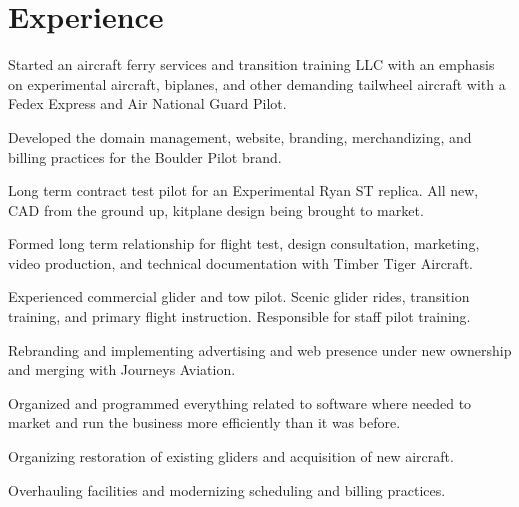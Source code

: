 \documentclass[]{mershon-two-column-resume}
\begin{document}
\begin{minipage}[t]{0.33\textwidth}
		\sectionsep
				
		
	\end{minipage} 
	\hfill
	\begin{minipage}[t]{0.66\textwidth} 
		
		
		\section{Experience}
		
		\vspace{\topsep} %
		\begin{tightemize}
			\item Started an aircraft ferry services and transition training LLC with an emphasis on experimental aircraft, biplanes, and other demanding tailwheel aircraft with a Fedex Express and Air National Guard Pilot.
			\item Developed the domain management, website, branding, merchandizing, and billing practices for the Boulder Pilot brand.
			\item Long term contract test pilot for an Experimental Ryan ST replica. All new, CAD from the ground up, kitplane design being brought to market.
			\item Formed long term relationship for flight test, design consultation, marketing, video production, and technical documentation with Timber Tiger Aircraft.
		\end{tightemize}
		\sectionsep
		
		\begin{tightemize}
			\item Experienced commercial glider and tow pilot. Scenic glider rides, transition training, and primary flight instruction. Responsible for staff pilot training.
			\item Rebranding and implementing advertising and web presence under new ownership and merging with Journeys Aviation.
			\item Organized and programmed everything related to software where needed to market and run the business more efficiently than it was before.
			\item Organizing restoration of existing gliders and acquisition of new aircraft.
			\item Overhauling facilities and modernizing scheduling and billing practices.
		\end{tightemize}
		\sectionsep
		

\end{minipage}
\end{document}

